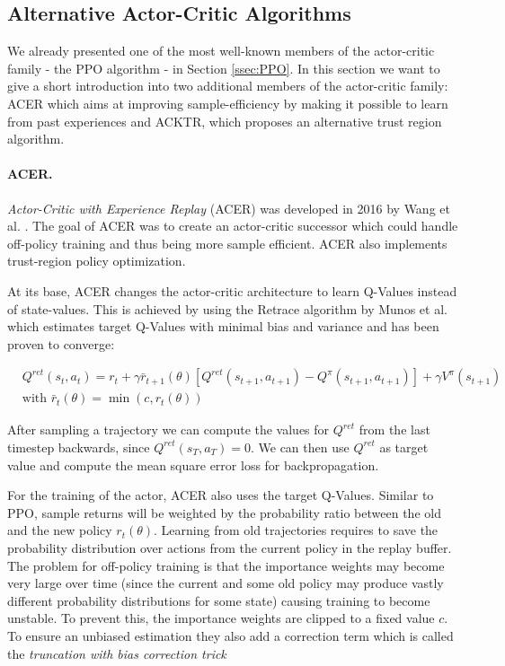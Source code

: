\subsection{Alternative Actor-Critic Algorithms} \label{ssec:AlternativeCombinedMethods}
We already presented one of the most well-known members of the actor-critic family - the PPO algorithm - in Section \ref{ssec:PPO}. In this section we want to give a short introduction into two additional members of the actor-critic family: ACER which aims at improving sample-efficiency by making it possible to learn from past experiences and ACKTR, which proposes an alternative trust region algorithm. 

\paragraph{ACER.}
\textit{Actor-Critic with Experience Replay} (ACER) was developed in 2016 by Wang et al. \cite{wang2016sample}. The goal of ACER was to create an actor-critic successor which could handle off-policy training and thus being more sample efficient. ACER also implements trust-region policy optimization.

At its base, ACER changes the actor-critic architecture to learn Q-Values instead of state-values. This is achieved by using the Retrace algorithm by Munos et al. \cite{munos2016safe} which estimates target Q-Values with minimal bias and variance and has been proven to converge:

\begin{align*}
  &Q^{ret}(s_t, a_t) = r_t + \gamma \bar{r}_{t+1}(\theta) \left[Q^{ret}(s_{t+1}, a_{t+1}) - Q^\pi(s_{t+1}, a_{t+1})\right] + \gamma V^\pi(s_{t+1}) \\
  &\text{with } \bar{r}_t(\theta) = \min(c, r_t(\theta))
\end{align*}

After sampling a trajectory we can compute the values for $Q^{ret}$ from the last timestep backwards, since $Q^{ret}(s_T, a_T) = 0$. We can then use $Q^{ret}$ as target value and compute the mean square error loss for backpropagation. 

For the training of the actor, ACER also uses the target Q-Values. Similar to PPO, sample returns will be weighted by the probability ratio between the old and the new policy $r_t(\theta)$. Learning from old trajectories requires to save the probability distribution over actions from the current policy in the replay buffer. The problem for off-policy training is that the importance weights may become very large over time (since the current and some old policy may produce vastly different probability distributions for some state) causing training to become unstable. To prevent this, the importance weights are clipped to a fixed value $c$. To ensure an unbiased estimation they also add a correction term which is called the \textit{truncation with bias correction trick} 

